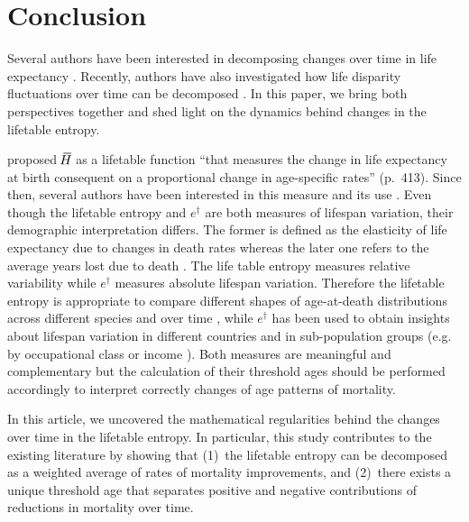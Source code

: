 \documentclass[a4paper,twoside, openright, 12pt, leqno]{article}
\newcommand*\xbar[1]{%
   \hbox{%
     \vbox{%
       \hrule height 0.5pt %
       \kern0.3ex%
       \hbox{%
         \kern-0.28em%
         \ensuremath{#1}%
         \kern-0.05em%
       }%
     }%
   }%
}
\begin{document}

\section{Conclusion}
 Several authors have been interested in decomposing changes over time in life expectancy \citep{arriaga1984measuring, Vaupel1986, pollard1988decomposition, Vaupel2003, beltran2008integrated, beltran2011unifying}. Recently, authors have also investigated how life disparity fluctuations over time can be decomposed \citep{Wagner2010, Zhang2009, Shkolnikov2011, Aburto2018Eastern, aburto2019upsurge}. In this paper, we bring both perspectives together and shed light on the dynamics behind changes in the lifetable entropy.
   
 \cite{Keyfitz1977} proposed $\,\xbar{H}$ as a lifetable function ``that measures the change in life expectancy at birth consequent on a proportional change in age-specific rates'' (p.~413). Since then, several authors have been interested in this measure and its use \citep{demetrius1978adaptive, Demetrius1979,mitra1978short,Goldman1986,Vaupel1986,Hakkert1987,hill1993entropy,Fernandez2015}. Even though the lifetable entropy and $e^\dagger$ are both measures of lifespan variation, their demographic interpretation differs. The former is defined as the elasticity of life expectancy due to changes in death rates \citep{keyfitz1968introduction} whereas the later one refers to the average years lost due to death \citep{Vaupel2011}. The life table entropy measures relative variability while $e^\dagger$ measures absolute lifespan variation. Therefore the lifetable entropy is appropriate to compare different shapes of age-at-death distributions across different species and over time \citep{baudisch2013pace,Wrycza2015}, while $e^\dagger$ has been used to obtain insights about lifespan variation in different countries and in sub-population groups (e.g. by occupational class or income \citep{vanRaalte2014,bronnum2017socially}). Both measures are meaningful and complementary but the calculation of their threshold ages should be performed accordingly to interpret correctly changes of age patterns of mortality.
 
 
 In this article, we uncovered the mathematical regularities behind the changes over time in the lifetable entropy. In particular, this study contributes to the existing literature by showing that (1)~the lifetable entropy can be decomposed as a weighted average of rates of mortality improvements, and (2)~there exists a unique threshold age that separates positive and negative contributions of reductions in mortality over time.
\end{document}
